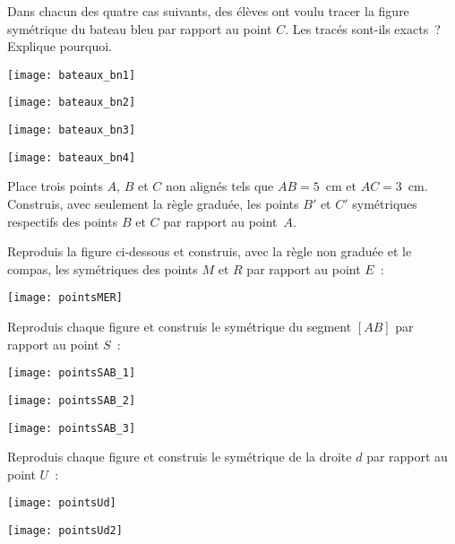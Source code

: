 \begin{exercice}
Dans chacun des quatre cas suivants, des élèves ont voulu tracer la figure symétrique du bateau bleu par rapport au point $C$. Les tracés sont-ils exacts ? Explique pourquoi. 
\begin{colenumerate}{2}
 \item 
 
 \texttt{[image: bateaux\_bn1]}
 \item 
 
 \texttt{[image: bateaux\_bn2]}
 \item 
 
 \texttt{[image: bateaux\_bn3]}
 \item 
 
 \texttt{[image: bateaux\_bn4]}
 \end{colenumerate}
\end{exercice}


\begin{exercice}
Place trois points $A$, $B$ et $C$ non alignés tels que $AB = 5$ cm et $AC = 3$ cm. Construis, avec seulement la règle graduée, les points $B'$ et $C'$ symétriques respectifs des points $B$ et $C$ par rapport au point $A$.
\end{exercice}


\begin{exercice}
Reproduis la figure ci-dessous et construis, avec la règle non graduée et le compas, les symétriques des points $M$ et $R$ par rapport au point $E$ :
 \begin{center} \texttt{[image: pointsMER]} \end{center}
\end{exercice}


\begin{exercice}
Reproduis chaque figure et construis le symétrique du segment $[AB]$ par rapport au point $S$ :
\begin{colenumerate}{3}
 \item 
 
 \texttt{[image: pointsSAB\_1]}
  \item 
 
 \texttt{[image: pointsSAB\_2]}
  \item 
 
 \texttt{[image: pointsSAB\_3]}
 \end{colenumerate}
\end{exercice}


\begin{exercice}
Reproduis chaque figure et construis le symétrique de la droite $d$ par rapport au point $U$ :
\begin{colenumerate}{2}
 \item 
 
 \texttt{[image: pointsUd]}
  \item 
 
 \texttt{[image: pointsUd2]}
 \end{colenumerate}
\end{exercice}


